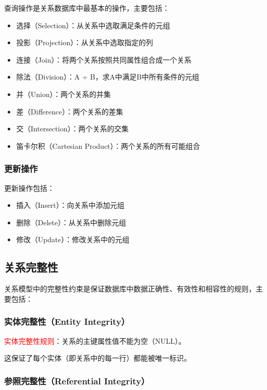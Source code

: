 \documentclass{../../note}
\begin{document}
查询操作是关系数据库中最基本的操作，主要包括：
\begin{itemize}
  \item 选择（Selection）：从关系中选取满足条件的元组
  \item 投影（Projection）：从关系中选取指定的列
  \item 连接（Join）：将两个关系按照共同属性组合成一个关系
  \item 除法（Division）：A ÷ B，求A中满足B中所有条件的元组
  \item 并（Union）：两个关系的并集
  \item 差（Difference）：两个关系的差集
  \item 交（Intersection）：两个关系的交集
  \item 笛卡尔积（Cartesian Product）：两个关系的所有可能组合
\end{itemize}

\subsubsection{更新操作}

更新操作包括：
\begin{itemize}
  \item 插入（Insert）：向关系中添加元组
  \item 删除（Delete）：从关系中删除元组
  \item 修改（Update）：修改关系中的元组
\end{itemize}

\subsection{关系完整性}

关系模型中的完整性约束是保证数据库中数据正确性、有效性和相容性的规则，主要包括：

\subsubsection{实体完整性（Entity Integrity）}

\textcolor{red}{实体完整性规则}：关系的主键属性值不能为空（NULL）。

这保证了每个实体（即关系中的每一行）都能被唯一标识。

\subsubsection{参照完整性（Referential Integrity）}
\end{document}
